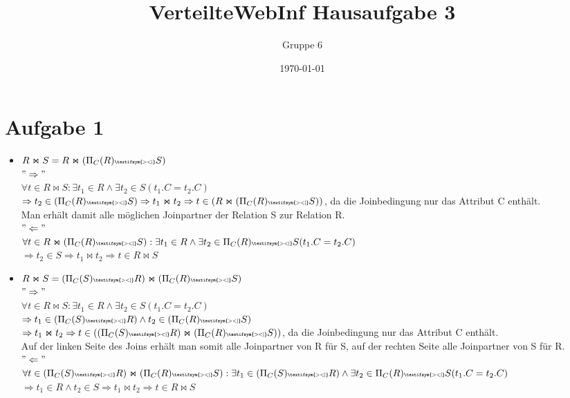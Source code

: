 \documentclass[a4paper]{article}
\author{Gruppe 6}
\title{\textbf{VerteilteWebInf Hausaufgabe 3}}
\date{\today}
\newcommand{\RightSemiJoin}{\textbf{\tiny	 \textifsym{><|}}}
\begin{document}
\maketitle


\section*{Aufgabe 1}
\begin{itemize}
\item $R \Join S = R \Join  (\Pi_C(R) \RightSemiJoin S)$\\

$"\Rightarrow"$ \\
$\forall t \in R \Join S: \exists t_1 \in R \land \exists t_2 \in S (t_1.C = t_2.C)$\\
$\Rightarrow t_2 \in (\Pi_C(R) \RightSemiJoin S) \Rightarrow t_1 \Join t_2 \Rightarrow t \in (R \Join (\Pi_C(R) \RightSemiJoin S))$, da  die Joinbedingung nur das Attribut C enthält.\\
Man erhält damit alle möglichen Joinpartner der Relation S zur Relation R. \\
$"\Leftarrow"$\\
$\forall t \in R \Join (\Pi_C(R) \RightSemiJoin S): \exists t_1 \in R \land \exists t_2 \in \Pi_C(R) \RightSemiJoin S (t_1.C = t_2.C)$\\
$\Rightarrow t_2 \in S \Rightarrow t_1 \Join t_2 \Rightarrow t \in R \Join S $\\

\item $R \Join S =  (\Pi_C(S) \RightSemiJoin R) \Join  (\Pi_C(R) \RightSemiJoin S)$\\

$"\Rightarrow"$ \\
$\forall t \in R \Join S: \exists t_1 \in R \land \exists t_2 \in S (t_1.C = t_2.C)$\\
$\Rightarrow t_1 \in (\Pi_C(S) \RightSemiJoin R) \land t_2 \in (\Pi_C(R) \RightSemiJoin S)$ \\
$\Rightarrow t_1 \Join t_2 \Rightarrow t \in ((\Pi_C(S) \RightSemiJoin R) \Join (\Pi_C(R) \RightSemiJoin S))$, da  die Joinbedingung nur das Attribut C enthält.\\
Auf der linken Seite des Joins erhält man somit alle Joinpartner von R  für S, auf der rechten Seite alle Joinpartner von S für R.\\
$"\Leftarrow"$\\
$\forall t \in (\Pi_C(S) \RightSemiJoin R) \Join (\Pi_C(R) \RightSemiJoin S): \exists t_1 \in (\Pi_C(S) \RightSemiJoin R) \land \exists t_2 \in \Pi_C(R) \RightSemiJoin S (t_1.C = t_2.C)$\\
$\Rightarrow t_1\in R \land t_2 \in S \Rightarrow t_1 \Join t_2 \Rightarrow t \in R \Join S $\\


\end{itemize}
\end{document}
